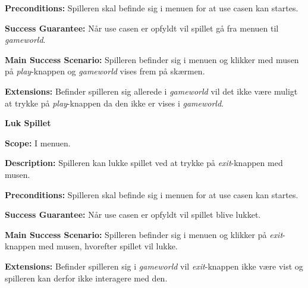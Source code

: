 \textbf{Preconditions:}\newline
Spilleren skal befinde sig i menuen for at use casen kan startes.\newline

\textbf{Success Guarantee:}\newline
Når use casen er opfyldt vil spillet gå fra menuen til \textit{gameworld}.\newline

\textbf{Main Success Scenario:}\newline
Spilleren befinder sig i menuen og klikker med musen på \textit{play}-knappen og \textit{gameworld} vises frem på skærmen.\newline

\textbf{Extensions:}\newline
Befinder spilleren sig allerede i \textit{gameworld} vil det ikke være muligt at trykke på \textit{play}-knappen da den ikke er vises i \textit{gameworld}.\newline \newline



\textbf{Luk Spillet}\newline

\textbf{Scope:}\newline
I menuen. \newline

\textbf{Description:} \newline
Spilleren kan lukke spillet ved at trykke på \textit{exit}-knappen med musen.\newline

\textbf{Preconditions:}\newline
Spilleren skal befinde sig i menuen for at use casen kan startes.\newline

\textbf{Success Guarantee:}\newline
Når use casen er opfyldt vil spillet blive lukket. \newline

\textbf{Main Success Scenario:}\newline
Spilleren befinder sig i menuen og klikker på \textit{exit}-knappen med musen, hvorefter spillet vil lukke.\newline

\textbf{Extensions:}\newline
Befinder spilleren sig i \textit{gameworld} vil \textit{exit}-knappen ikke være vist og spilleren kan derfor ikke interagere med den. \newline \newline


